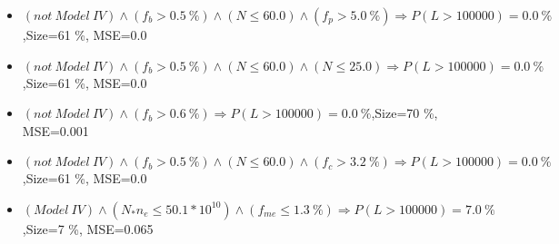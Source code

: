 \documentclass[numbered]{CSL}
\begin{document}
\begin{itemize}
\item $(not~Model~IV) \land (f_b > 0.5~\%) \land (N \leq 60.0) \land (f_p > 5.0~\%) \Rightarrow P(L > 100 000) = 0.0~\%$,\hfill Size=61 \%, MSE=0.0
\item $(not~Model~IV) \land (f_b > 0.5~\%) \land (N \leq 60.0) \land (N \leq 25.0) \Rightarrow P(L > 100 000) = 0.0~\%$,\hfill Size=61 \%, MSE=0.0
\item $(not~Model~IV) \land (f_b > 0.6~\%) \Rightarrow P(L > 100 000) = 0.0~\%$,\hfill Size=70 \%, MSE=0.001
\item $(not~Model~IV) \land (f_b > 0.5~\%) \land (N \leq 60.0) \land (f_c > 3.2~\%) \Rightarrow P(L > 100 000) = 0.0~\%$,\hfill Size=61 \%, MSE=0.0
\item $(Model~IV) \land (N_* n_e \leq 50.1 * 10^{10}) \land (f_{me} \leq 1.3~\%) \Rightarrow P(L > 100 000) = 7.0~\%$,\hfill Size=7 \%, MSE=0.065
\end{itemize}
\end{document}
